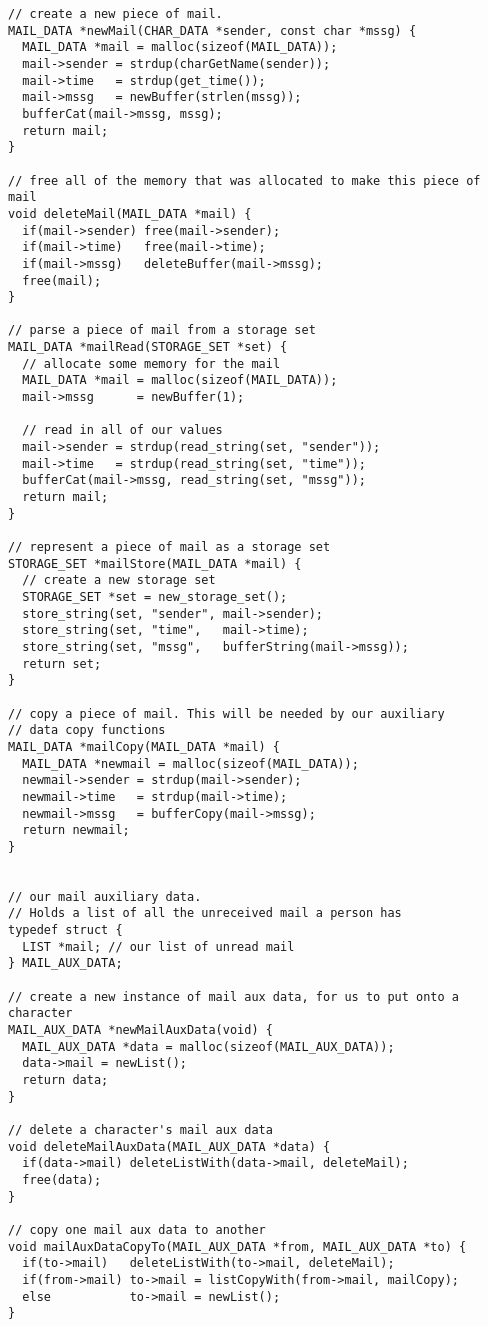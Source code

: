 \documentclass[12pt]{article}
\begin{document}
{\begin{verbatim}
// create a new piece of mail.
MAIL_DATA *newMail(CHAR_DATA *sender, const char *mssg) {
  MAIL_DATA *mail = malloc(sizeof(MAIL_DATA));
  mail->sender = strdup(charGetName(sender));
  mail->time   = strdup(get_time());
  mail->mssg   = newBuffer(strlen(mssg));
  bufferCat(mail->mssg, mssg);
  return mail;
}

// free all of the memory that was allocated to make this piece of mail
void deleteMail(MAIL_DATA *mail) {
  if(mail->sender) free(mail->sender);
  if(mail->time)   free(mail->time);
  if(mail->mssg)   deleteBuffer(mail->mssg);
  free(mail);
}

// parse a piece of mail from a storage set
MAIL_DATA *mailRead(STORAGE_SET *set) {
  // allocate some memory for the mail
  MAIL_DATA *mail = malloc(sizeof(MAIL_DATA));
  mail->mssg      = newBuffer(1);

  // read in all of our values
  mail->sender = strdup(read_string(set, "sender"));
  mail->time   = strdup(read_string(set, "time"));
  bufferCat(mail->mssg, read_string(set, "mssg"));
  return mail;
}

// represent a piece of mail as a storage set
STORAGE_SET *mailStore(MAIL_DATA *mail) {
  // create a new storage set
  STORAGE_SET *set = new_storage_set();
  store_string(set, "sender", mail->sender);
  store_string(set, "time",   mail->time);
  store_string(set, "mssg",   bufferString(mail->mssg));
  return set;
}

// copy a piece of mail. This will be needed by our auxiliary
// data copy functions
MAIL_DATA *mailCopy(MAIL_DATA *mail) {
  MAIL_DATA *newmail = malloc(sizeof(MAIL_DATA));
  newmail->sender = strdup(mail->sender);
  newmail->time   = strdup(mail->time);
  newmail->mssg   = bufferCopy(mail->mssg);
  return newmail;
}


// our mail auxiliary data. 
// Holds a list of all the unreceived mail a person has
typedef struct {
  LIST *mail; // our list of unread mail
} MAIL_AUX_DATA;

// create a new instance of mail aux data, for us to put onto a character
MAIL_AUX_DATA *newMailAuxData(void) {
  MAIL_AUX_DATA *data = malloc(sizeof(MAIL_AUX_DATA));
  data->mail = newList();
  return data;
}

// delete a character's mail aux data
void deleteMailAuxData(MAIL_AUX_DATA *data) {
  if(data->mail) deleteListWith(data->mail, deleteMail);
  free(data);
}

// copy one mail aux data to another
void mailAuxDataCopyTo(MAIL_AUX_DATA *from, MAIL_AUX_DATA *to) {
  if(to->mail)   deleteListWith(to->mail, deleteMail);
  if(from->mail) to->mail = listCopyWith(from->mail, mailCopy);
  else           to->mail = newList();
}


\end{verbatim}}
\end{document}
